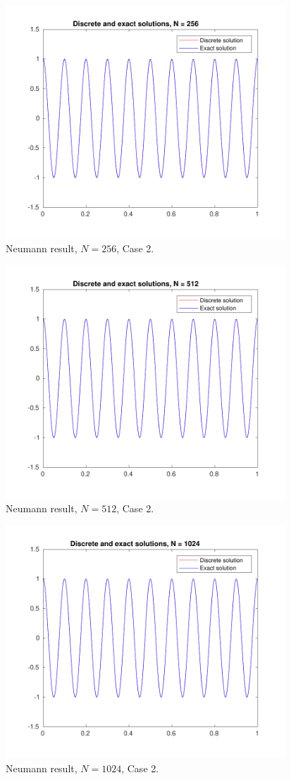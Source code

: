 \documentclass[a4paper]{article}
\numberwithin{equation}{section}
\begin{document}
\begin{figure}[H]
\centering\includegraphics[width=10.5cm]{fig_neumann_result_G1_CP1_I1_N256_M9_C2}
\caption{Neumann result, $N=256$, Case 2.}
\end{figure}
\begin{figure}[H]
\centering\includegraphics[width=10.5cm]{fig_neumann_result_G1_CP1_I1_N512_M9_C2}
\caption{Neumann result, $N=512$, Case 2.}
\end{figure}
\begin{figure}[H]
\centering\includegraphics[width=10.5cm]{fig_neumann_result_G1_CP1_I1_N1024_M9_C2}
\caption{Neumann result, $N=1024$, Case 2.}
\end{figure}
\end{document}
